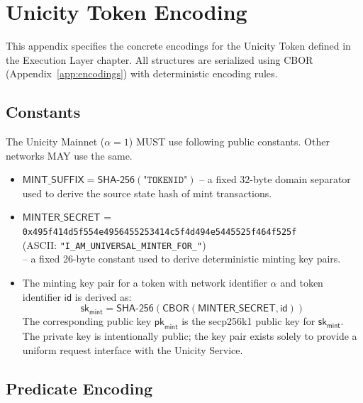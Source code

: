 \chapter{Unicity Token Encoding}\label{app:execution-layer}

This appendix specifies the concrete encodings for the Unicity Token defined in the Execution Layer chapter. All structures are serialized using CBOR (Appendix~\ref{app:encodings}) with deterministic encoding rules.

\section{Constants}\label{app:el-constants}

The Unicity Mainnet ($\alpha = 1$) MUST use following public constants. Other networks MAY use the same.

\begin{itemize}
	\item $\mathsf{MINT\_SUFFIX} = \mathsf{SHA\text{-}256}(\texttt{"TOKENID"})$ -- a fixed 32-byte domain separator used to derive the source state hash of mint transactions.
	\item $\mathsf{MINTER\_SECRET}$ = \\
	  \hspace*{10mm}\texttt{0x495f414d5f554e4956455253414c5f4d494e5445525f464f525f} \\
	  \hspace*{10mm} (ASCII: \texttt{"I\_AM\_UNIVERSAL\_MINTER\_FOR\_"}) \\
	  -- a fixed 26-byte constant used to derive deterministic minting key pairs.
	\item The minting key pair for a token with network identifier $\alpha$ and token identifier $\mathsf{id}$ is derived as:
	\[
	\mathsf{sk}_\mathsf{mint} = \mathsf{SHA\text{-}256}(\mathsf{CBOR}(\mathsf{MINTER\_SECRET}, \mathsf{id}))
	\]
	The corresponding public key $\mathsf{pk}_\mathsf{mint}$ is the secp256k1 public key for $\mathsf{sk}_\mathsf{mint}$. The private key is intentionally public; the key pair exists solely to provide a uniform request interface with the Unicity Service.
\end{itemize}

\newcommand{\encpred}{\mathsf{EncPred}}
\newcommand{\decpred}{\mathsf{DecodePred}}

\section{Predicate Encoding}\label{app:predicate-encoding}

